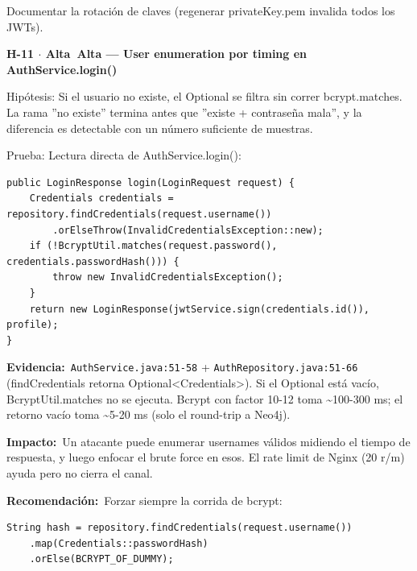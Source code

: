 \documentclass[10pt,a4paper]{article}
\newcommand{\code}[1]{\nolinkurl{#1}}
\newcommand{\badgeAlta}{\colorbox{orange!20}{\textcolor{orange!90!black}{\textbf{\footnotesize Alta}}}}
\begin{document}
Documentar la rotación de claves (regenerar privateKey.pem invalida todos los JWTs).\par\vspace{0.4em}
\vspace{0.8em}\noindent\textbf{\large H-11 $\cdot$ \badgeAlta\  Alta --- User enumeration por timing en AuthService.login()}\par\vspace{0.3em}
Hipótesis: Si el usuario no existe, el Optional se filtra sin correr bcrypt.matches. La rama ''no existe'' termina antes que ''existe + contraseña mala'', y la diferencia es detectable con un número suficiente de muestras.\par\vspace{0.4em}
Prueba: Lectura directa de AuthService.login():\par\vspace{0.4em}
\begin{tcolorbox}[colback=codebg,colframe=gray!40,arc=1mm]\small
\begin{verbatim}
public LoginResponse login(LoginRequest request) {
    Credentials credentials = repository.findCredentials(request.username())
        .orElseThrow(InvalidCredentialsException::new);
    if (!BcryptUtil.matches(request.password(), credentials.passwordHash())) {
        throw new InvalidCredentialsException();
    }
    return new LoginResponse(jwtService.sign(credentials.id()), profile);
}
\end{verbatim}
\end{tcolorbox}\vspace{0.4em}
\noindent\textbf{Evidencia:}\ \code{AuthService.java:51-58} + \code{AuthRepository.java:51-66} (findCredentials retorna Optional<Credentials>). Si el Optional está vacío, BcryptUtil.matches no se ejecuta. Bcrypt con factor 10-12 toma \textasciitilde{}100-300 ms; el retorno vacío toma \textasciitilde{}5-20 ms (solo el round-trip a Neo4j).\par\vspace{0.4em}
\noindent\textbf{Impacto:}\ Un atacante puede enumerar usernames válidos midiendo el tiempo de respuesta, y luego enfocar el brute force en esos. El rate limit de Nginx (20 r/m) ayuda pero no cierra el canal.\par\vspace{0.4em}
\noindent\textbf{Recomendación:}\ Forzar siempre la corrida de bcrypt:\par\vspace{0.4em}
\begin{tcolorbox}[colback=codebg,colframe=gray!40,arc=1mm]\small
\begin{verbatim}
String hash = repository.findCredentials(request.username())
    .map(Credentials::passwordHash)
    .orElse(BCRYPT_OF_DUMMY);
\end{verbatim}
\end{tcolorbox}\vspace{0.4em}
\end{document}

